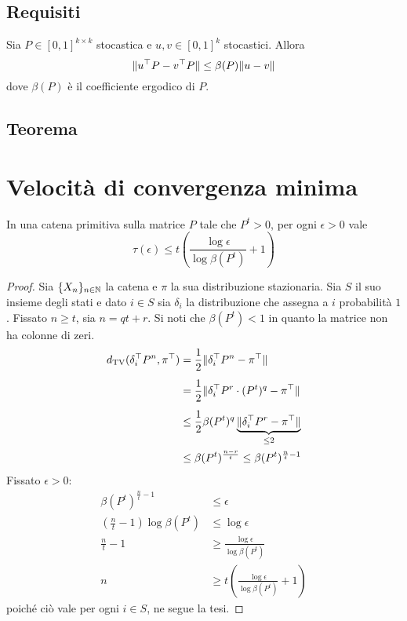 \subsection{Requisiti}
\begin{lemma}[di contrazione]\label{lemma:contra}
	Sia $P\in[0,1]^{k\times k}$ stocastica e $u,v\in[0,1]^k$ stocastici. Allora
	\begin{equation*}
		\|u^\top P-v^\top P\| \le \beta(P)\|u-v\|
	\end{equation*}
	dove $\beta(P)$ è il coefficiente ergodico di $P$.
\end{lemma}


\subsection{Teorema}
\section{Velocità di convergenza minima}
\begin{thm}
	In una catena primitiva sulla matrice $P$ tale che $P^t>0$, per ogni $\epsilon>0$ vale
	\begin{equation*}
		\tau(\epsilon)\le t\left(\frac{\log\epsilon}{\log\beta(P^t)}+1\right)
	\end{equation*}
\end{thm}
\begin{proof}
	Sia $\{X_n\}_{n\in\mathbb N}$ la catena e $\pi$ la sua distribuzione stazionaria. Sia $S$ il suo insieme degli stati e dato $i\in S$ sia $\delta_i$ la distribuzione che assegna a $i$ probabilità $1$. Fissato $n\ge t$, sia $n=qt+r$. Si noti che $\beta(P^t)<1$ in quanto la matrice non ha colonne di zeri.
	\begin{align*}
		d_{\mathrm{TV}}(\delta_i^\top P^n,\pi^\top) & = \frac12\|\delta_i^\top P^n-\pi^\top\|                                   \\[1ex]
		                               & = \frac12\|\delta_i^\top P^r\cdot (P^t)^q-\pi^\top\|                      \\[1ex]
		                               & \le \frac12\beta(P^t)^q\underbrace{\|\delta_i^\top P^r-\pi^\top\|}_{\le2} \\
		                               & \le \beta(P^t)^{\frac{n-r}{t}} \le \beta(P^t)^{\frac n t -1}
	\end{align*}
	Fissato $\epsilon>0$:
	\begin{align*}
		\beta(P^t)^{\frac n t -1}             & \le \epsilon                                            \\
		\left(\frac nt-1\right)\log\beta(P^t) & \le \log\epsilon                                        \\
		\frac nt-1                            & \ge \frac{\log\epsilon}{\log\beta(P^t)}                 \\
		n                                     & \ge t\left(\frac{\log\epsilon}{\log\beta(P^t)}+1\right)
	\end{align*}
	poiché ciò vale per ogni $i\in S$, ne segue la tesi.
\end{proof}
